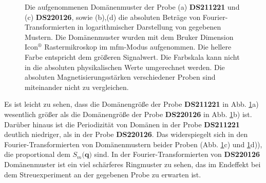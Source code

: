 \begin{figure}[H]
    \centering
    
    \caption{Die aufgenommenen Domänenmuster der Probe (a) \textbf{DS211221} und (c) \textbf{DS220126}, sowie (b),(d) die absoluten Beträge von Fourier-Transformierten in logarithmischer Darstellung von gegebenen Mustern. Die Domänenmuster wurden mit dem Bruker Dimension Icon$^{\text{®}}$ Rastermikroskop im \gls{mfm}-Modus aufgenommen. Die hellere Farbe entspricht dem größeren Signalwert. Die Farbskala kann nicht in die absoluten physikalischen Werte umgerechnet werden. Die absoluten Magnetisierungsstärken verschiedener Proben sind miteinander nicht zu vergleichen.}
    \label{fig:mfm-amplitude-ft}
\end{figure}
\noindent
Es ist leicht zu sehen, dass die Domänengröße der Probe \textbf{DS211221} in Abb. \ref{fig:mfm-amplitude-ft}a) wesentlich größer als die Domänengröße der Probe \textbf{DS220126} in Abb. \ref{fig:mfm-amplitude-ft}b) ist. Darüber hinaus ist die Periodizität von Domänen in der Probe \textbf{DS211221} deutlich niedriger, als in der Probe  \textbf{DS220126}. Das widerspiegelt sich in den Fourier-Transformierten von Domänenmustern beider Proben (Abb. \ref{fig:mfm-amplitude-ft}c) und \ref{fig:mfm-amplitude-ft}d)), die proportional dem $S_m(\mathbf{q)}$ sind. In der Fourier-Transformierten von \textbf{DS220126} Domänenmuster ist ein viel schärferes Ringmuster zu sehen, das im Endeffekt bei dem Streuexperiment an der gegebenen Probe zu erwarten ist.

